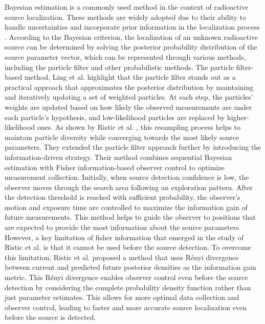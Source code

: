 \documentclass[../report.tex]{subfiles}
\begin{document}
    Bayesian estimation is a commonly used method in the context of radioactive source localization. These methods are widely adopted due to their ability to handle uncertainties and incorporate
    prior information in the localization process \cite{hu2024autonomous}. According to the Bayesian criterion, the localization of an unknown radioactive source can be determined by solving the posterior probability distribution
    of the source parameter vector, which can be represented through various methods, including the particle filter \cite{Ristic2007AnIG} \cite{ristic2010information} \cite{ling2022multi} and other probabilistic methods. The particle filter-based method, 
    Ling et al. \cite{ling2022multi} highlight that the particle filter stands out as a practical approach that approximates the posterior distribution by maintaining and iteratively updating a set of weighted
    particles. At each step, the particles' weights are updated based on how likely the observed measurements are under each particle's hypothesis, and low-likelihood particles are replaced by higher-likelihood ones. 
    As shown by Ristic et al. \cite{Ristic2007AnIG}, this resampling process helps to maintain particle diversity while converging towards the most likely source parameters. They extended the 
    particle filter approach further by introducing the information-driven strategy. Their method combines sequential Bayesian estimation with Fisher information-based observer control to optimize measurement
    collection. Initially, when source detection confidence is low, the observer moves through the search area following an exploration pattern. After the detection threshold is reached with sufficient
    probability, the observer's motion and exposure time are controlled to maximize the information gain of future measurements. This method helps to guide the observer to positions that are expected
    to provide the most information about the source parameters. However, a key limitation of fisher information that emerged in the study of Ristic et al. \cite{ristic2010information} is that it 
    cannot be used before the source detection. To overcome this limitation, Ristic et al. proposed a method that uses Rényi divergence between current and predicted future posterior densities as 
    the information gain metric. This Rényi divergence enables observer control even before the source detection by considering the complete probability density function rather than just parameter estimates.
    This allows for more optimal data collection and observer control, leading to faster and more accurate source localization even before the source is detected. 
\end{document}
